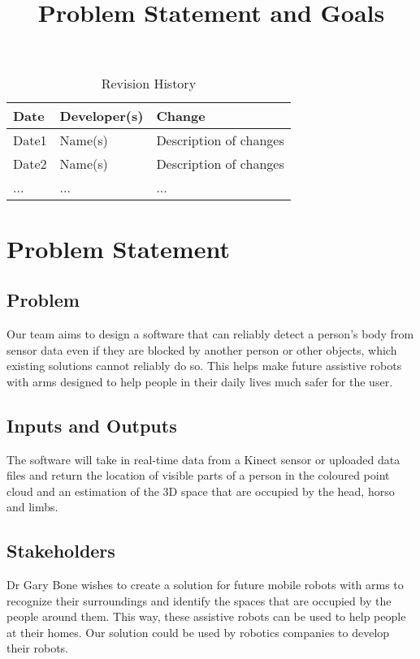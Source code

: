 \documentclass{article}
\title{Problem Statement and Goals\\\progname}
\author{\authname}
\date{}
\begin{document}
\maketitle

\begin{table}[hp]
\caption{Revision History} \label{TblRevisionHistory}
\begin{tabularx}{\textwidth}{llX}
\toprule
\textbf{Date} & \textbf{Developer(s)} & \textbf{Change}\\
\midrule
Date1 & Name(s) & Description of changes\\
Date2 & Name(s) & Description of changes\\
... & ... & ...\\
\bottomrule
\end{tabularx}
\end{table}

\section{Problem Statement}

\subsection{Problem}
Our team aims to design a software that can reliably detect a person’s body from sensor data even if they are blocked by another person or other objects, which existing solutions cannot reliably do so. This helps make future assistive robots with arms designed to help people in their daily lives much safer for the user.

\subsection{Inputs and Outputs}
The software will take in real-time data from a Kinect sensor or uploaded data files and return the location of visible parts of a person in the coloured point cloud and an estimation of the 3D space that are occupied by the head, horso and limbs.

\subsection{Stakeholders}
Dr Gary Bone wishes to create a solution for future mobile robots with arms to recognize their surroundings and identify the spaces that are occupied by the people around them. This way, these assistive robots can be used to help people at their homes. Our solution could be used by robotics companies to develop their robots.
\end{document}
